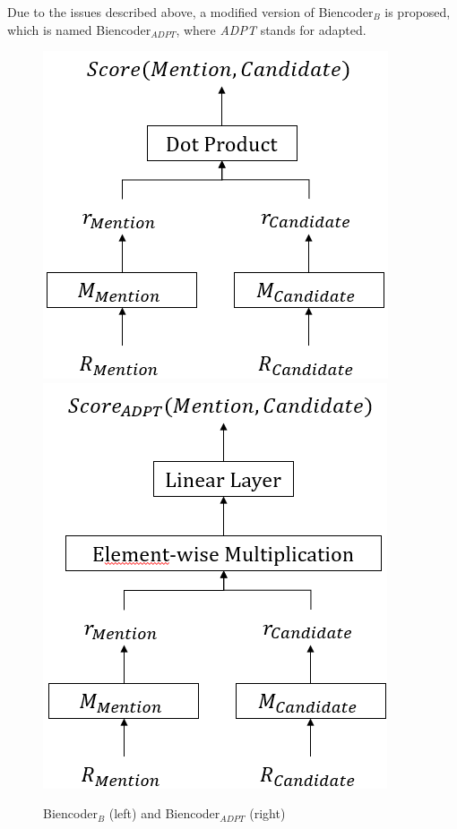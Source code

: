 \documentclass{report}
\theoremstyle{definition}
\theoremstyle{remark}
\begin{document}
Due to the issues described above, a modified version of Biencoder$_{B}$ is proposed, which is named Biencoder$_{ADPT}$, where \textit{ADPT} stands for adapted.

\begin{figure}[H]
    \centering
    \includegraphics[scale=0.65]{BiencoderB.png}
    \hspace{1.5cm}
    \includegraphics[scale=0.65]{BiencoderADPT.png}
    \caption{Biencoder$_{B}$ (left) and Biencoder$_{ADPT}$ (right)}
    \label{fig:biencoderB}
\end{figure}
\end{document}
